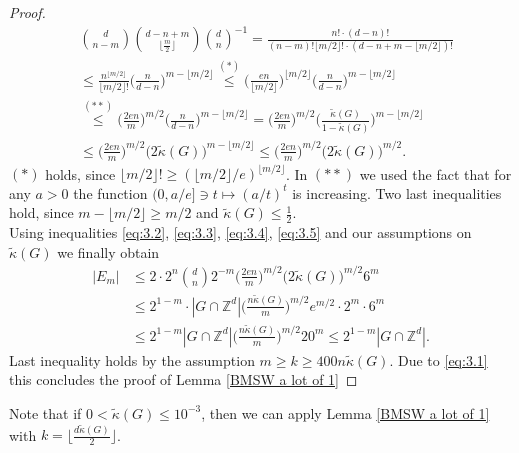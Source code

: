\documentclass[10pt,a4paper]{amsart}
\numberwithin{equation}{section}
\begin{document}
\begin{proof}
\begin{equation}
\begin{split}
        &\binom{d}{n-m} \binom{d-n+m}{\lfloor \frac{m}{2} \rfloor} \binom{d}{n}^{-1} = \frac{n! \cdot (d-n)!}{(n-m)! \lfloor m/2 \rfloor! \cdot (d-n+m-\lfloor m/2 \rfloor)!}  \\
        &\leq \frac{n^{\lfloor m/2 \rfloor}}{\lfloor m/2 \rfloor!} \Big( \frac{n}{d-n} \Big)^{m-\lfloor m/2 \rfloor} \stackrel{(*)}{\leq} \Big( \frac{en}{\lfloor m/2 \rfloor} \Big)^{\lfloor m/2 \rfloor} \Big( \frac{n}{d-n} \Big)^{m-\lfloor m/2 \rfloor}  \\ 
        &\stackrel{(**)}{\leq} \Big( \frac{2en}{m} \Big)^{ m/2 } \Big( \frac{n}{d-n} \Big)^{m-\lfloor m/2 \rfloor}= \Big( \frac{2en}{m} \Big)^{ m/2 } \Big( \frac{\widetilde{\kappa}(G)}{1-\widetilde{\kappa}(G)} \Big)^{m-\lfloor m/2 \rfloor}  \\
    &\leq \Big( \frac{2en}{m} \Big)^{ m/2 } \Big( 2\widetilde{\kappa}(G) \Big)^{m-\lfloor m/2 \rfloor} \leq \Big( \frac{2 en}{m} \Big)^{ m/2 } \Big( 2\widetilde{\kappa}(G) \Big)^{m/2}.
    \end{split}
\end{equation} 
$(*)$ holds, since $\lfloor m/2 \rfloor! \geq (\lfloor m/2 \rfloor/e)^{\lfloor m/2 \rfloor}$. In $(**)$ we used the fact that for any $a>0$ the function $(0,a/e] \ni t \mapsto (a/t)^t$ is increasing. Two last inequalities hold, since $m-\lfloor m/2 \rfloor \geq m/2$ and $\widetilde{\kappa}(G) \le \frac{1}{2}$. \\
Using inequalities \eqref{eq:3.2}, \eqref{eq:3.3}, \eqref{eq:3.4}, \eqref{eq:3.5} and our assumptions on $\widetilde{\kappa}(G)$ we finally obtain
\begin{equation*} 
\begin{split}    
|E_m| &\leq 2 \cdot2^n \binom{d}{n} 2^{-m}  \Big( \frac{2en}{m} \Big)^{ m/2 } \Big( 2\widetilde{\kappa}(G) \Big)^{m/2} 6^m \\
 &\leq  2^{1-m}  \cdot |G \cap \mathbb{Z}^d| \Big(\frac{n\widetilde{\kappa}(G)}{m}\Big)^{m/2} e^{m/2} \cdot 2^{m} \cdot  6^m\\
 &\leq  2^{1-m} |G \cap \mathbb{Z}^d| \Big(\frac{n\widetilde{\kappa}(G)}{m}\Big)^{m/2} 20^m \leq  2^{1-m} |G \cap \mathbb{Z}^d|.
 \end{split}
 \end{equation*}
Last inequality holds by the assumption $m \geq k \geq 400n \widetilde{\kappa}(G) $. Due to \eqref{eq:3.1} this concludes the proof of Lemma \ref{BMSW a lot of 1}
\end{proof}
Note that if $0<\widetilde{\kappa}(G) \le 10^{-3}$, then we can apply Lemma \ref{BMSW a lot of 1} with $k=\lfloor \frac{d \widetilde{\kappa}(G)}{2} \rfloor$.
\end{document}
